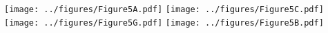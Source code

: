 \documentclass[class=minimal,border=0pt]{standalone}
\begin{document}
\texttt{[image: ../figures/Figure5A.pdf]}
\texttt{[image: ../figures/Figure5C.pdf]}
\texttt{[image: ../figures/Figure5G.pdf]}
\texttt{[image: ../figures/Figure5B.pdf]}
\end{document}
